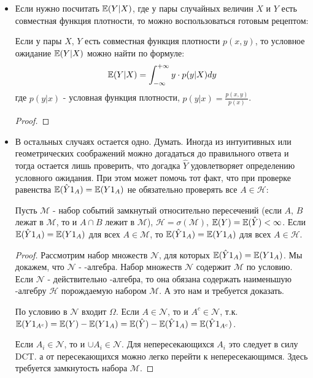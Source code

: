 {\begin{itemize}
\item Если нужно посчитать $\mathbb{E}(Y|X)$, где у пары случайных величин $X$ и $Y$ есть совместная функция плотности, то можно воспользоваться готовым рецептом:
\begin{myth}
Если у пары $X$, $Y$ есть совместная функция плотности $p(x,y)$, то условное ожидание $\mathbb{E}(Y|X)$ можно найти по формуле:
\begin{equation}
\mathbb{E}(Y|X)=\int_{-\infty}^{+\infty}y\cdot p(y|X)dy
\end{equation}
где $p(y|x)$ - условная функция плотности, $p(y|x)=\frac{p(x,y)}{p(x)}$.
\end{myth}
\begin{proof}

\end{proof}

\item В остальных случаях остается одно. Думать. Иногда из интуитивных или геометрических соображений можно догадаться до правильного ответа и тогда остается лишь проверить, что догадка $\hat{Y}$ удовлетворяет определению условного ожидания. При этом может помочь тот факт, что при проверке равенства $\mathbb{E}(\hat{Y}1_{A})=\mathbb{E}(Y1_{A})$ не обязательно проверять все $A\in\mathcal{H}$:
\begin{myth}
Пусть $\mathcal{M}$ - набор событий замкнутый относительно пересечений (если $A$, $B$ лежат в $\mathcal{M}$, то и $A\cap B$ лежит в $\mathcal{M}$), $\mathcal{H}=\sigma(\mathcal{M})$, $\mathbb{E}(Y)=\mathbb{E}(\hat{Y})<\infty$. Если $\mathbb{E}(\hat{Y}1_{A})=\mathbb{E}(Y1_{A})$ для всех $A\in\mathcal{M}$, то $\mathbb{E}(\hat{Y}1_{A})=\mathbb{E}(Y1_{A})$ для всех $A\in\mathcal{H}$.
\end{myth}
\begin{proof}
Рассмотрим набор множеств $\mathcal{N}$, для которых $\mathbb{E}(\hat{Y}1_{A})=\mathbb{E}(Y1_{A})$. Мы докажем, что $\mathcal{N}$ - \s-алгебра. Набор множеств $\mathcal{N}$ содержит $\mathcal{M}$ по условию. Если $\mathcal{N}$ - действительно \s-алгебра, то она обязана содержать наименьшую \s-алгебру $\mathcal{H}$ порождаемую набором $\mathcal{M}$. А это нам и требуется доказать.

По условию в $\mathcal{N}$ входит $\Omega$. Если $A\in\mathcal{N}$, то и $A^{c}\in\mathcal{N}$, т.к. $\mathbb{E}(Y1_{A^{c}})=\mathbb{E}(Y)-\mathbb{E}(Y1_{A})=\mathbb{E}(\hat{Y})-\mathbb{E}(\hat{Y}1_{A})=\mathbb{E}(\hat{Y}1_{A^{c}})$.

Если $A_{i}\in\mathcal{N}$, то и $\cup A_{i}\in\mathcal{N}$. Для непересекающихся $A_{i}$ это следует в силу DCT. а от пересекающихся можно легко перейти к непересекающимся. Здесь требуется замкнутость набора $\mathcal{M}$.
\end{proof}


\end{itemize}}
